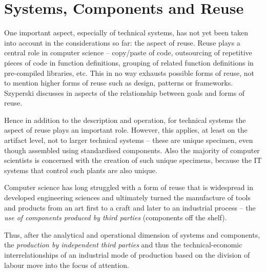 \documentclass[11pt,a4paper]{article}
\begin{document}
\section{Systems, Components and Reuse}

One important aspect, especially of technical systems, has not yet been taken
into account in the considerations so far: the aspect of reuse. Reuse plays a
central role in computer science -- copy/paste of code, outsourcing of
repetitive pieces of code in function definitions, grouping of related
function definitions in pre-compiled libraries, etc. This in no way exhausts
possible forms of reuse, not to mention higher forms of reuse such as design,
patterns or frameworks. Szyperski discusses in \cite[ch. 8]{Szyperski2002}
aspects of the relationship between goals and forms of reuse.

Hence in addition to the description and operation, for technical systems the
aspect of reuse plays an important role. However, this applies, at least on
the artifact level, not to larger technical systems – these are unique
specimen, even though assembled using standardised components. Also the
majority of computer scientists is concerned with the creation of such unique
specimens, because the IT systems that control such plants are also unique. 

Computer science has long struggled with a form of reuse that is widespread in
developed engineering sciences and ultimately turned the manufacture of tools
and products from an art first to a craft and later to an industrial process
-- the \emph{use of components produced by third parties} (components off the
shelf).

Thus, after the analytical and operational dimension of systems and
components, the \emph{production by independent third parties} and thus the
technical-economic interrelationships of an industrial mode of production
based on the division of labour move into the focus of attention.
\end{document}
